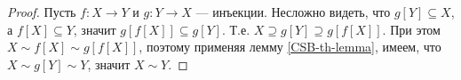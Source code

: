\documentclass[12pt,a4paper]{article}
\begin{document}
\begin{proof}
        Пусть $f: X \to Y$ и $g: Y \to X$ --- инъекции. Несложно видеть, что $g[Y] \subseteq X$, а $f[X] \subseteq Y$, значит $g[f[X]] \subseteq g[Y]$. Т.е. $X \supseteq g[Y] \supseteq g[f[X]]$. При этом $X \sim f[X] \sim g[f[X]]$, поэтому применяя лемму \ref{CSB-th-lemma}, имеем, что $X \sim g[Y] \sim Y$, значит $X \sim Y$.
    \end{proof}
\end{document}
